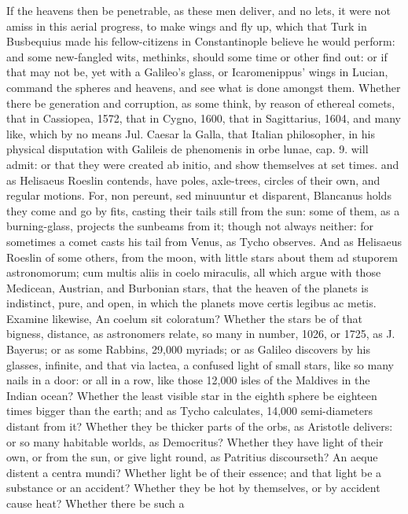 {If the heavens then be penetrable, as these men deliver, and no lets,
it were not amiss in this aerial progress, to make wings and fly up,
which that Turk in Busbequius made his fellow-citizens in
Constantinople believe he would perform: and some new-fangled wits,
methinks, should some time or other find out: or if that may not be,
yet with a Galileo's glass, or Icaromenippus' wings in Lucian, command
the spheres and heavens, and see what is done amongst them. Whether
there be generation and corruption, as some think, by reason of
ethereal comets, that in Cassiopea, 1572, that in Cygno, 1600, that in
Sagittarius, 1604, and many like, which by no means Jul. Caesar la
Galla, that Italian philosopher, in his physical disputation with
Galileis de phenomenis in orbe lunae, cap. 9. will admit: or that they
were created ab initio, and show themselves at set times. and as
Helisaeus Roeslin contends, have poles, axle-trees, circles of
their own, and regular motions. For, non pereunt, sed minuuntur et
disparent, Blancanus holds they come and go by fits, casting
their tails still from the sun: some of them, as a burning-glass,
projects the sunbeams from it; though not always neither: for sometimes
a comet casts his tail from Venus, as Tycho observes. And as
Helisaeus Roeslin of some others, from the moon, with little
stars about them ad stuporem astronomorum; cum multis aliis in coelo
miraculis, all which argue with those Medicean, Austrian, and Burbonian
stars, that the heaven of the planets is indistinct, pure, and open, in
which the planets move certis legibus ac metis. Examine likewise, An
coelum sit coloratum? Whether the stars be of that bigness, distance,
as astronomers relate, so many in number, 1026, or 1725, as J.
Bayerus; or as some Rabbins, 29,000 myriads; or as Galileo discovers by
his glasses, infinite, and that via lactea, a confused light of small
stars, like so many nails in a door: or all in a row, like those 12,000
isles of the Maldives in the Indian ocean? Whether the least visible
star in the eighth sphere be eighteen times bigger than the earth; and
as Tycho calculates, 14,000 semi-diameters distant from it? Whether
they be thicker parts of the orbs, as Aristotle delivers: or so many
habitable worlds, as Democritus? Whether they have light of their own,
or from the sun, or give light round, as Patritius discourseth? An
aeque distent a centra mundi? Whether light be of their essence; and
that light be a substance or an accident? Whether they be hot by
themselves, or by accident cause heat? Whether there be such a
}
